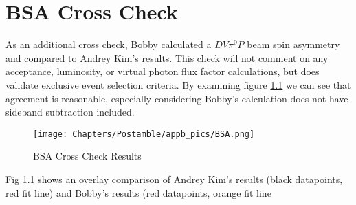 \chapter{BSA Cross Check}

As an additional cross check, Bobby calculated a $DV\pi^0P$ beam spin asymmetry and compared to Andrey Kim's results. This check will not comment on any acceptance, luminosity, or virtual photon flux factor calculations, but does validate exclusive event selection criteria. By examining figure \ref{fig:bsa} we can see that agreement is reasonable, especially considering Bobby's calculation does not have sideband subtraction included.

\begin{figure}[hbt]
	\centering
	\texttt{[image: Chapters/Postamble/appb\_pics/BSA.png]}
	
	
	\caption{BSA Cross Check Results}
	\label{fig:bsa}
\end{figure}

Fig \ref{fig:bsa} shows an overlay comparison of Andrey Kim's results (black datapoints, red fit line) and Bobby's results (red datapoints, orange fit line